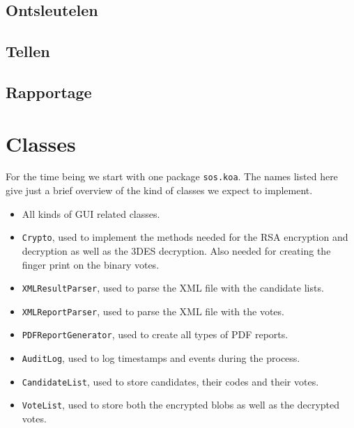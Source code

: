 \documentclass{article}
\begin{document}
\subsection{Ontsleutelen}
\subsection{Tellen}
\subsection{Rapportage}

\section{Classes}
For the time being we start with one package \verb+sos.koa+.
The names listed here give just a brief overview of the kind of classes we expect to implement.
\begin{itemize}
\item All kinds of GUI related classes.
\item \verb+Crypto+, used to implement the methods needed for the RSA encryption and decryption as well as the 3DES decryption. Also needed for creating the finger print on the binary votes.
\item \verb+XMLResultParser+, used to parse the XML file with the candidate lists.
\item \verb+XMLReportParser+, used to parse the XML file with the votes.
\item \verb+PDFReportGenerator+, used to create all types of PDF reports.
\item \verb+AuditLog+, used to log timestamps and events during the process.
\item \verb+CandidateList+, used to store candidates, their codes and their votes.
\item \verb+VoteList+, used to store both the encrypted blobs as well as the decrypted votes.
\end{itemize}

{
\renewcommand{\listfigurename}{List of Questions}
\listoffigures
}



\end{document}
